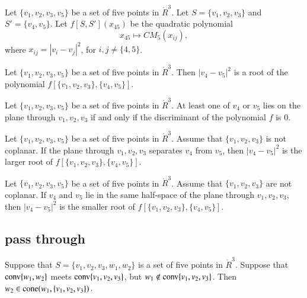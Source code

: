 \begin{definition}[f]
Let $\{v_1,v_2,v_3,v_5\}$ be a set of five
points in $\ring{R}^3$.   Let $S=\{v_1,v_2,v_3\}$ and $S'=\{v_4,v_5\}$.
Let $f[S,S'](x_{45})$ be the quadratic polynomial 
   $$x_{45}\mapsto CM_5(x_{ij}),$$
where $x_{ij} = |v_i-v_j|^2$, for ${i,j}\ne \{4,5\}$.  
\end{definition}

\begin{lemma}
Let $\{v_1,v_2,v_3,v_5\}$ be a set of five
points in $\ring{R}^3$.  
Then $|v_4-v_5|^2$ is a root of the polynomial 
$f[\{v_1,v_2,v_3\},\{v_4,v_5\}]$. 
\end{lemma}


\begin{lemma}
Let $\{v_1,v_2,v_3,v_5\}$ be a set of five
points in $\ring{R}^3$.  
At least one of $v_4$ or $v_5$ lies on the plane through $v_1,v_2,v_3$ if and only if
the discriminant of the polynomial $f$ is $0$.
\end{lemma}

\begin{lemma}
Let $\{v_1,v_2,v_3,v_5\}$ be a set of five
points in $\ring{R}^3$.  Assume that $\{v_1,v_2,v_3\}$ is not coplanar.
If the plane through $v_1,v_2,v_3$ separates
$v_4$ from $v_5$, then $|v_4-v_5|^2$ is the larger root of 
$f[\{v_1,v_2,v_3\},\{v_4,v_5\}]$.
\end{lemma}

\begin{lemma} 
Let $\{v_1,v_2,v_3,v_5\}$ be a set of five
points in $\ring{R}^3$.  Assume that $\{v_1,v_2,v_3\}$ are not
coplanar.
If $v_4$ and $v_5$ lie in the same half-space of the plane through $v_1,v_2,v_3$, then 
 $|v_4-v_5|^2$ is the smaller root of $f[\{v_1,v_2,v_3\},\{v_4,v_5\}]$.
\end{lemma}




\newpage

\subsection{pass through}

\begin{lemma}
Suppose that $S=\{v_1,v_2,v_3,w_1,w_2\}$
is a set of five points in  $\ring{R}^3$.  Suppose
that  ${\operatorname{conv}}\{w_1,w_2\}$ meets ${\operatorname{conv}}\{v_1,v_2,v_3\}$,
but $w_1\not\in{\operatorname{conv}}\{v_1,v_2,v_3\}$.
Then $w_2\in{\operatorname{cone}}(w_1,\{v_1,v_2,v_3\})$.
\end{lemma}

